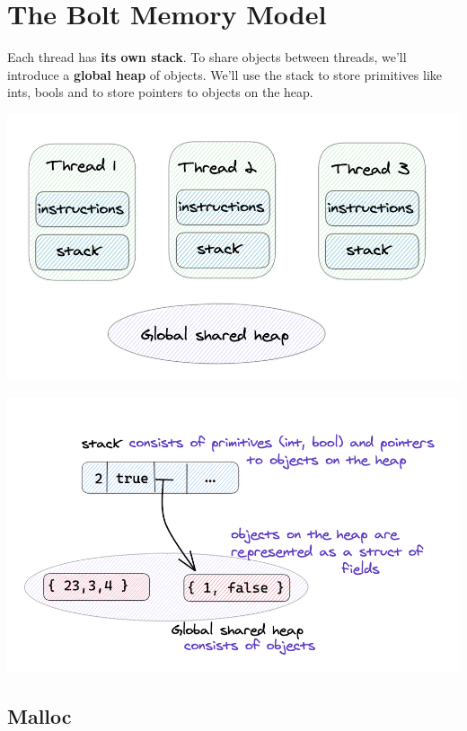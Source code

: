 \hypertarget{the-bolt-memory-model}{%
\section{\texorpdfstring{\protect\hyperlink{the-bolt-memory-model}{}The
Bolt Memory Model}{The Bolt Memory Model}}\label{the-bolt-memory-model}}

Each thread has \textbf{its own stack}. To share objects between
threads, we'll introduce a \textbf{global heap} of objects. We'll use
the stack to store primitives like ints, bools and to store pointers to
objects on the heap.

{
\href{https://mukulrathi.com/static/f9e2f9b192e5a29e4bca4304ec811151/b4904/hardware-threads.png}{{}
\includegraphics[width=\linewidth]{09_files/hardware-threads.png}} }

{
\href{https://mukulrathi.com/static/ff99489ea7fb99d5a54e6d5a32342340/e53e8/stack-heap.png}{{}
\includegraphics[width=\linewidth]{09_files/stack-heap.png}} }

\hypertarget{malloc}{%
\subsection{\texorpdfstring{\protect\hyperlink{malloc}{}Malloc}{Malloc}}\label{malloc}}

